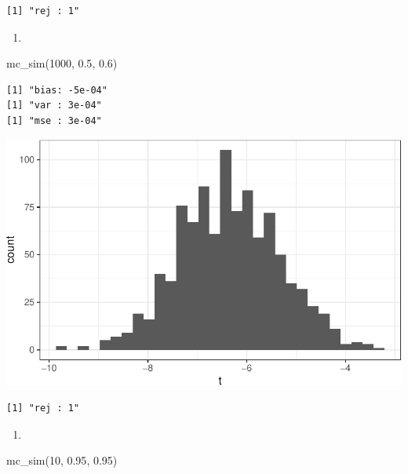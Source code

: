 \documentclass[
  letterpaper,
  DIV=11,
  numbers=noendperiod]{scrreprt}
\newenvironment{Shaded}{\begin{snugshade}}{\end{snugshade}}
\newcommand{\DecValTok}[1]{\textcolor[rgb]{0.68,0.00,0.00}{#1}}
\newcommand{\FloatTok}[1]{\textcolor[rgb]{0.68,0.00,0.00}{#1}}
\newcommand{\FunctionTok}[1]{\textcolor[rgb]{0.28,0.35,0.67}{#1}}
\newcommand{\NormalTok}[1]{\textcolor[rgb]{0.00,0.23,0.31}{#1}}
\providecommand{\tightlist}{%
  \setlength{\itemsep}{0pt}\setlength{\parskip}{0pt}}\usepackage{longtable,booktabs,array}
\begin{document}
\begin{verbatim}
[1] "rej : 1"
\end{verbatim}

\begin{enumerate}
\def\labelenumi{\arabic{enumi}.}
\setcounter{enumi}{6}
\tightlist
\item
\end{enumerate}

\begin{Shaded}
\begin{Highlighting}[]
\FunctionTok{mc\_sim}\NormalTok{(}\DecValTok{1000}\NormalTok{, }\FloatTok{0.5}\NormalTok{, }\FloatTok{0.6}\NormalTok{)}
\end{Highlighting}
\end{Shaded}

\begin{verbatim}
[1] "bias: -5e-04"
[1] "var : 3e-04"
[1] "mse : 3e-04"
\end{verbatim}

\includegraphics{07-inference_files/figure-pdf/unnamed-chunk-14-1.pdf}

\begin{verbatim}
[1] "rej : 1"
\end{verbatim}

\begin{enumerate}
\def\labelenumi{\arabic{enumi}.}
\setcounter{enumi}{7}
\tightlist
\item
\end{enumerate}

\begin{Shaded}
\begin{Highlighting}[]
\FunctionTok{mc\_sim}\NormalTok{(}\DecValTok{10}\NormalTok{, }\FloatTok{0.95}\NormalTok{, }\FloatTok{0.95}\NormalTok{)}
\end{Highlighting}
\end{Shaded}
\end{document}
